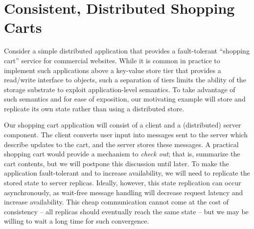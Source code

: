\section{Consistent, Distributed Shopping Carts}
\label{sec:motivation}

Consider a simple distributed application that provides a fault-tolerant
``shopping cart'' service for commercial websites.  While it is common in
practice to implement such applications above a key-value store tier that
provides a read/write interface to objects, such a separation of tiers limits
the ability of the storage substrate to exploit application-level semantics.
To take advantage of such semantics and for ease of exposition,
our motivating example will store and replicate its own state rather
than using a distributed store.


Our shopping cart application will consist of a client and a (distributed)
server component.  The client converts user input into messages sent to
the server which describe updates to the cart, and the server stores these 
messages.  
A practical shopping cart would provide a mechanism to {\em check out}; that is,
summarize the cart contents, but we will postpone this discussion until later.
To make the application fault-tolerant and to increase availability, 
we will need to replicate the stored state to server replicas.  Ideally, however,
this state replication can occur asynchronously, as wait-free message handling
will decrease request latency and increase availability.  This cheap communication
cannot come at the cost of consistency -- all replicas should eventually reach
the same state -- but we may be willing to wait a long time for such convergence.

